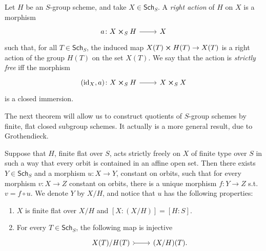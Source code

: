\documentclass[../Main]{subfiles}
\begin{document}
\begin{defn}
	Let $H$ be an $S$-group scheme, and take $X \in \mathsf{Sch}_{ S }$.
	A {\em right action} of $H$ on $X$ is a morphism
	\begin{equation*}
	\begin{tikzcd}[row sep = 0ex
		,/tikz/column 1/.append style={anchor=base east}
		,/tikz/column 2/.append style={anchor=base west}]
		a\colon X \cross_{ S } H \arrow[r, "", rightarrow] &
		X
	\end{tikzcd}
	\end{equation*} 
	such that, for all $T \in \mathsf{Sch}_{ S }$, the induced map
	$X(T) \cross H(T) \to  X(T)$ is a right action of the
	group $H(T)$ on the set $X(T)$.
	We say that the action is {\em strictly free} iff the morphism
	\begin{equation*}
	\begin{tikzcd}[row sep = 0ex
		,/tikz/column 1/.append style={anchor=base east}
		,/tikz/column 2/.append style={anchor=base west}]
		(\mathrm{id}_{ X }, a)\colon X \cross_{ S } H \arrow[r, "", rightarrow] &
		X \cross_{ S } X
	\end{tikzcd}
	\end{equation*} 
	is a closed immersion.
\end{defn}

The next theorem will allow us to construct quotients of
$S$-group schemes by finite, flat closed subgroup schemes.
It actually is a more general result, due to Grothendieck.
\begin{thm}
	Suppose that $H$, finite flat over $S$, acts strictly freely on $X$
	of finite type over $S$ in such a way that every orbit is contained in an affine open set.
	Then there exists $Y \in \mathsf{Sch}_{ S }$ and a morphism $u\colon X \to Y$,
	constant on orbits, such that for every morphism $v\colon X \to Z$ constant on orbits,
	there is a unique morphism $f\colon Y \to Z$ s.t. $v = f \circ u$.
	We denote $Y$ by $X/H$, and notice that $u$ has the following properties:
\begin{enumerate}
	\item $X$ is finite flat over $X/H$ and $[X:(X/H)] = [H:S]$.
		
	\item For every $T \in \mathsf{Sch}_{ S }$, the following map is injective
		\begin{equation*}
		\begin{tikzcd}
			X(T)/H(T) \arrow[r, "", rightarrowtail] &
			(X/H)(T)
		.\end{tikzcd}
		\end{equation*}
\end{enumerate}
\end{thm}
\end{document}
